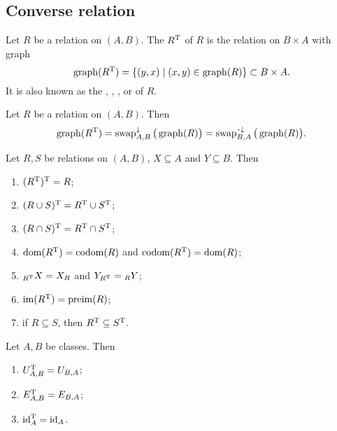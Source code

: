 \subsection{Converse relation}
\begin{definition}
Let $R$ be a relation on $(A, B)$. The  $R^{\mathrm{T}}$ of $R$ is the relation on $B\times A$ with graph
\[ \graph(R^{\transp}) = \setbuilder{(y,x)}{(x,y)\in \graph(R)} \subset B\times A. \]
It is also known as the , , ,  or  of $R$.
\end{definition}

\begin{lemma} \label{transposeSwapLemma}
Let $R$ be a relation on $(A, B)$. Then
\[ \operatorname{graph}(R^{\mathrm{T}}) = \operatorname{swap}_{A,B}^\downarrow\big(\operatorname{graph}(R)\big) = \operatorname{swap}_{B,A}^{\text{\hspace{0.15em}-}\downarrow}\big(\operatorname{graph}(R)\big). \]
\end{lemma}

\begin{lemma}
Let $R,S$ be relations on $(A, B)$, $X\subseteq A$ and $Y\subseteq B$. Then
\begin{enumerate}
\item $(R^{\mathrm{T}})^{\mathrm{T}} = R$;
\item $(R \cup S)^{\mathrm{T}} = R^{\mathrm{T}} \cup S^{\mathrm{T}}$;
\item $(R \cap S)^{\mathrm{T}} = R^{\mathrm{T}} \cap S^{\mathrm{T}}$;
\item $\operatorname{dom}(R^{\mathrm{T}}) = \operatorname{codom}(R)$ and $\operatorname{codom}(R^{\mathrm{T}}) = \operatorname{dom}(R)$;
\item $_{R^{\mathrm{T}}}X = X_R$ and $Y_{R^{\mathrm{T}}} = {_RY}$;
\item $\operatorname{im}(R^{\mathrm{T}}) = \operatorname{preim}(R)$;
\item if $R\subseteq S$, then $R^{\mathrm{T}} \subseteq S^{\mathrm{T}}$.
\end{enumerate}
\end{lemma}

\begin{lemma}
Let $A,B$ be classes. Then
\begin{enumerate}
\item $U_{A,B}^{\mathrm{T}} = U_{B,A}$;
\item $E_{A,B}^{\mathrm{T}} = E_{B,A}$;
\item $\operatorname{id}_A^{\mathrm{T}} = \operatorname{id}_A$.
\end{enumerate}
\end{lemma}

